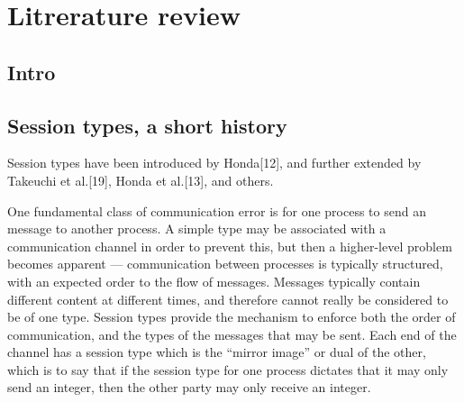 \section{Litrerature review}

\subsection{Intro}
\label{sub: intro}
%
%
%
%


\subsection{Session types, a short history}
\label{sub: st}


Session types have been introduced by Honda[12], and further extended by Takeuchi et al.[19], Honda et al.[13], and others.

One fundamental class of communication error is for one process to send an
 message to another process. A simple type may be associated with a communication channel in order to prevent this, but then a higher-level problem becomes apparent — communication between processes is typically structured, with an expected order to the flow of messages. Messages typically contain different content at different times, and therefore cannot really be considered to be of one type. Session types provide the mechanism to enforce both the order of communication, and the types of the messages that may be sent. Each end of the channel has a session type which is the “mirror image” or dual of the other, which is to say that if the session type for one process dictates that it may only send an integer, then the other party may only receive an integer.

